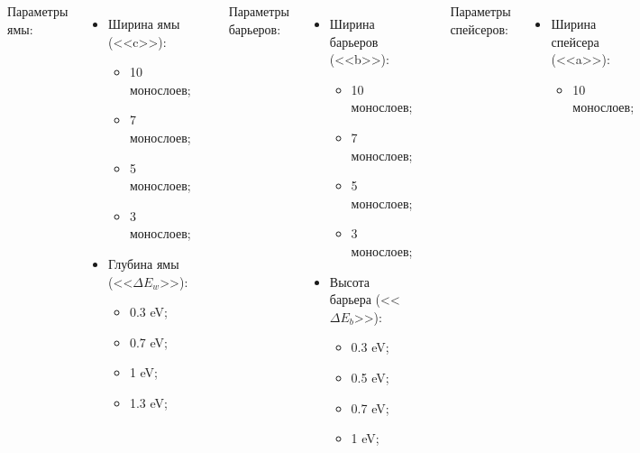 \documentclass[10pt,pdf,hyperref={unicode},aspectratio={169}]{beamer}
\begin{document}
\begin{frame}
\begin{columns}
	{\color{red} Параметры ямы:}
	\footnotesize
	\begin{itemize}
		\item Ширина ямы (<<c>>): \begin{itemize}
			\footnotesize
			\item 10 монослоев;
			\item 7 монослоев;
			\item 5 монослоев;
			\item 3 монослоев;
		\end{itemize}
		\item Глубина ямы (<<$\Delta E_{w}$>>): \begin{itemize}
			\footnotesize
			\item 0.3 eV;
			\item 0.7 eV;
			\item 1 eV;
			\item 1.3 eV;
		\end{itemize} 
	\end{itemize}
	\rule[0mm]{0.2ex}{40mm}
	{\color{red} Параметры барьеров:}
	\footnotesize
	\begin{itemize}
		\item Ширина барьеров (<<b>>): \begin{itemize}
			\footnotesize
			\item 10 монослоев;
			\item 7 монослоев;
			\item 5 монослоев;
			\item 3 монослоев;
		\end{itemize}
		\item Высота барьера (<<$\Delta E_{b}$>>): \begin{itemize}
			\footnotesize
			\item 0.3 eV;
			\item 0.5 eV;
			\item 0.7 eV;
			\item 1 eV;
		\end{itemize} 
	\end{itemize}
	\rule[0mm]{0.2ex}{40mm}
	{\color{red} Параметры спейсеров:}
	\footnotesize
	\begin{itemize}
		\item Ширина спейсера (<<a>>): \begin{itemize}
			\footnotesize
			\item 10 монослоев;

\end{itemize}
\end{itemize}
\end{columns}
\end{frame}
\end{document}
